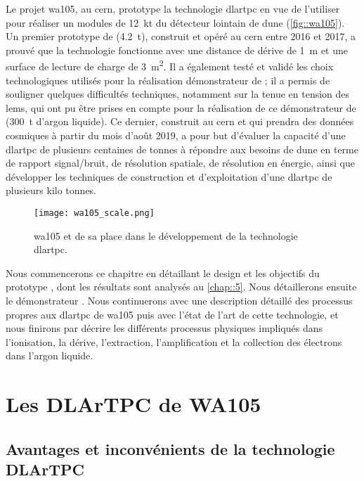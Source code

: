     Le projet \gls{wa105}, au \gls{cern}, prototype la technologie \gls{dlartpc} en vue de l'utiliser pour réaliser un modules de \SI{12}{\kilo\tonne} du détecteur lointain de \gls{dune} (\autoref{fig::wa105}). Un premier prototype de \TOO{} (\SI{4.2}{\tonne}), construit et opéré au \gls{cern} entre 2016 et 2017, a prouvé que la technologie fonctionne avec une distance de dérive de \SI{1}{\meter} et une surface de lecture de charge de \SI{3}{\meter\squared}. Il a également testé et validé les choix technologiques utilisés pour la réalisation démonstrateur de \protodp{}; il a permis de souligner quelques difficultés techniques, notamment sur la tenue en tension des \glspl{lem}, qui ont pu être prises en compte pour la réalisation de ce démonstrateur de \SSS{} (\SI{300}{\tonne} d'argon liquide). Ce dernier, construit au \gls{cern} et qui prendra des données cosmiques à partir du mois d'août 2019, a pour but d'évaluer la capacité d'une \gls{dlartpc} de plusieurs centaines de tonnes à répondre aux besoins de \gls{dune} en terme de rapport signal/bruit, de résolution spatiale, de résolution en énergie, ainsi que développer les techniques de construction et d'exploitation d'une \gls{dlartpc} de plusieurs kilo tonnes.

    \begin{figure}[!htb]
      \centering
      \texttt{[image: wa105\_scale.png]}        
      \caption[Le projet WA105]{\label{fig::wa105}\gls{wa105} et de sa place dans le développement de la technologie \gls{dlartpc}.}
    \end{figure}

    Nous commencerons ce chapitre en détaillant le design et les objectifs du prototype \TOO{}, dont les résultats sont analysés au \autoref{chap::5}. Nous détaillerons ensuite le démonstrateur \SSS{}. Nous continuerons avec une description détaillé des processus propres aux \gls{dlartpc} de \gls{wa105} puis avec l'état de l'art de cette technologie, et nous finirons par décrire les différents processus physiques impliqués dans l'ionisation, la dérive, l'extraction, l'amplification et la collection des électrons dans l'argon liquide.

  \section{Les DLArTPC de WA105}

    \subsection{Avantages et inconvénients de la technologie DLArTPC}

